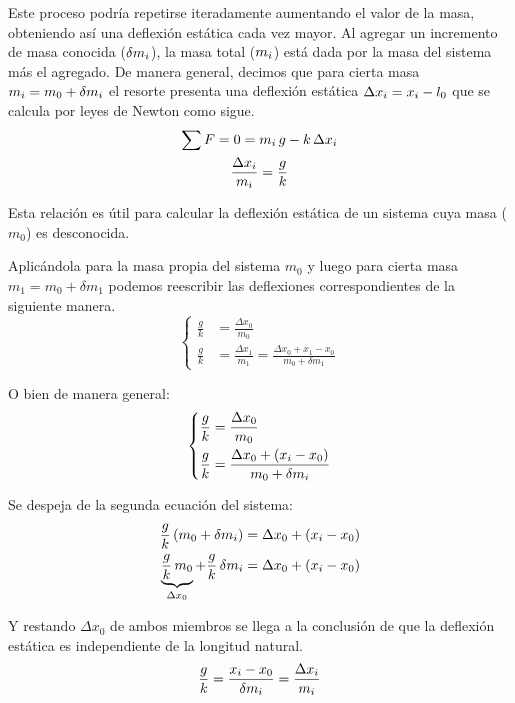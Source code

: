Este proceso podría repetirse iteradamente aumentando el valor de la masa, obteniendo así una deflexión estática cada vez mayor.
Al agregar un incremento de masa conocida ($\delta m_i$), la masa total ($m_i$) está dada por la masa del sistema más el agregado.
De manera general, decimos que para cierta masa $m_i=m_0+\delta m_i$ el resorte presenta una deflexión estática $\Delta x_i=x_i-l_0$ que se calcula por leyes de Newton como sigue.
\begin{gather*}
    \sum F = 0 = m_i \, g - k \, \Delta x_i
    \\
    \frac{\Delta x_i}{m_i} = \frac{g}{k}
\end{gather*}

Esta relación es útil para calcular la deflexión estática de un sistema cuya masa ($m_0$) es desconocida.

Aplicándola para la masa propia del sistema $m_0$ y luego para cierta masa $m_1=m_0 + \delta m_1$ podemos reescribir las deflexiones correspondientes de la siguiente manera.
\begin{equation*}
    \left\{
    \begin{aligned}
        \frac{g}{k} &= \frac{\Delta x_0}{m_0}
        \\
        \frac{g}{k} &= \frac{\Delta x_1}{m_1} = \frac{\Delta x_0 + x_1 - x_0}{m_0 + \delta m_1}
    \end{aligned}
    \right.
\end{equation*}

O bien de manera general:
\begin{equation*}
    \left\{
    \begin{aligned}
        \frac{g}{k} &= \frac{\Delta x_0}{m_0}
        \\
        \frac{g}{k} &= \frac{\Delta x_0 + (x_i - x_0)}{m_0 + \delta m_i}
    \end{aligned}
    \right.
\end{equation*}

Se despeja de la segunda ecuación del sistema:
\begin{align*}
    \frac{g}{k} \left( m_0 + \delta m_i \right) &= \Delta x_0 + (x_i - x_0)
    \\
    \underbrace{\frac{g}{k} \, m_0}_{\Delta x_0} + \frac{g}{k} \, \delta m_i &= \Delta x_0 + (x_i - x_0)
\end{align*}

Y restando $\Delta x_0$ de ambos miembros se llega a la conclusión de que la deflexión estática es independiente de la longitud natural.
\begin{equation*}
    \frac{g}{k} = \frac{x_i-x_0}{\delta m_i} = \frac{\Delta x_i}{m_i}
\end{equation*}


